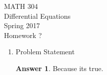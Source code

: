 \documentclass{amsart}
\theoremstyle{definition}
\newtheorem*{Ans}{Answer}
\begin{document}
\begin{center}
	{\bgbf MATH 304\\ \smallskip
	Differential Equations\\ \smallskip
	Spring 2017\\ \smallskip
	Homework ?}
\end{center}
\smallskip

\begin{enumerate}
	\item[1a.] Problem Statement
		\begin{Ans}
        	Because its true.
        \end{Ans}
\end{enumerate}
\end{document}
